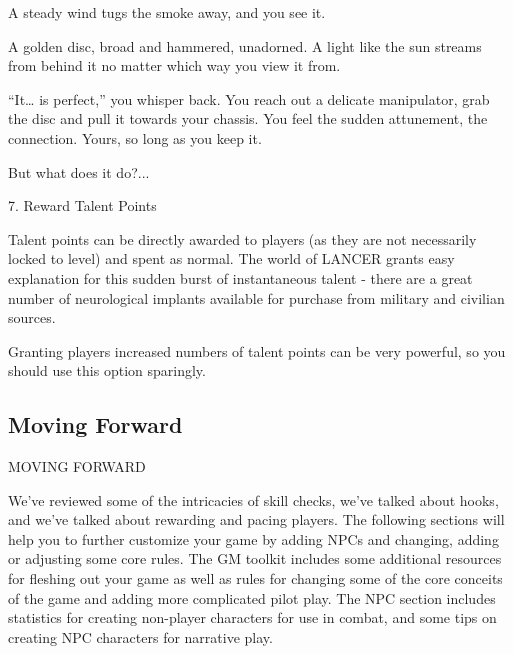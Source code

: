 A steady wind tugs the smoke away, and you see it.   

A golden disc, broad and hammered, unadorned. A light like the sun streams from behind it no  
matter which way you view it from.   

“It… is perfect,” you whisper back. You reach out a delicate manipulator, grab the disc and pull it  
towards your chassis. You feel the sudden attunement, the connection. Yours, so long as you  
keep it.   

But what does it do?...  

7. Reward Talent Points
 
Talent points can be directly awarded to players (as they are not necessarily locked to level) and  
spent as normal. The world of LANCER grants easy explanation for this sudden burst of  
instantaneous talent - there are a great number of neurological implants available for purchase  
from military and civilian sources.
 

                                                                                                               


Granting players increased numbers of talent points can be very powerful, so you should use this  
option sparingly.
 
\subsection{Moving Forward}
                                       MOVING FORWARD  

We’ve reviewed some of the intricacies of skill checks, we’ve talked about hooks, and we’ve  
talked about rewarding and pacing players. The following sections will help you to further  
customize your game by adding NPCs and changing, adding or adjusting some core rules.  
The GM toolkit includes some additional resources for fleshing out your game as well as rules  
for changing some of the core conceits of the game and adding more complicated pilot play. The  
NPC section includes statistics for creating non-player characters for use in combat, and some  
tips on creating NPC characters for narrative play.
 